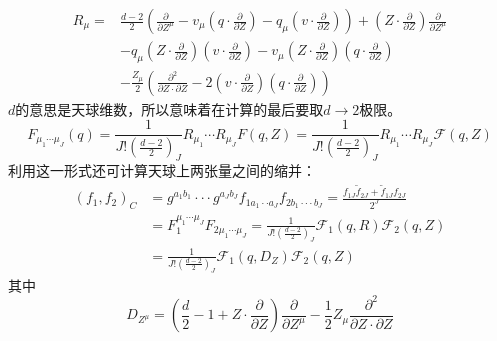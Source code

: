 \begin{equation}
	\begin{aligned}
		R_{\mu}=& \frac{d-2}{2}\left(\frac{\partial}{\partial Z^{\mu}}-v_{\mu}\left(q\cdot\frac{\partial}{\partial Z}\right)-q_{\mu}\left(v\cdot\frac{\partial}{\partial Z}\right)\right)+\left(Z\cdot\frac{\partial}{\partial Z}\right)\frac{\partial}{\partial Z^{\mu}}  \\
		&-q_{\mu}\left(Z\cdot\frac\partial{\partial Z}\right)\left(v\cdot\frac\partial{\partial Z}\right)-v_{\mu}\left(Z\cdot\frac\partial{\partial Z}\right)\left(q\cdot\frac\partial{\partial Z}\right) \\
		&-\frac{Z_{\mu}}{2}\left(\frac{\partial^{2}}{\partial Z\cdot\partial Z}-2\left(v\cdot\frac{\partial}{\partial Z}\right)\left(q\cdot\frac{\partial}{\partial Z}\right)\right)
	\end{aligned}
\end{equation}
$d$的意思是天球维数，所以意味着在计算的最后要取$d\to 2$极限。
\begin{equation}
	F_{\mu_{1}\cdots\mu_{J}}(q)=\frac{1}{J!\left(\frac{d-2}{2}\right)_{J}}R_{\mu_{1}}\cdots R_{\mu_{J}}F(q,Z)=\frac{1}{J!\left(\frac{d-2}{2}\right)_{J}}R_{\mu_{1}}\cdots R_{\mu_{J}}\mathcal{F}(q,Z)
\end{equation}
利用这一形式还可计算天球上两张量之间的缩并：
\begin{equation}
	\begin{aligned}
		(f_1,f_2)_C&=g^{a_1b_1}\cdotp\cdotp\cdotp g^{a_Jb_J}f_{1a_1\cdotp\cdotp a_J}f_{2b_1\cdotp\cdotp\cdotp b_J}=\frac{f_{1J}\tilde{f}_{2J}+\tilde{f}_{1J}f_{2J}}{2^J}\\
		&=F_{1}^{\mu_{1}\cdots\mu_{J}}F_{2\mu_{1}\cdots\mu_{J}}=\frac{1}{J!\left(\frac{d-2}{2}\right)_{J}}\mathcal{F}_{1}(q,R)\mathcal{F}_{2}(q,Z)\\
		&=\frac{1}{J!\left(\frac{d-2}{2}\right)_{J}}\mathcal{F}_{1}(q,D_Z)\mathcal{F}_{2}(q,Z)
	\end{aligned}
\end{equation}
其中
\[D_{Z^{\mu}}=\left(\frac{d}{2}-1+Z\cdot\frac{\partial}{\partial Z}\right)\frac{\partial}{\partial Z^{\mu}}-\frac{1}{2}Z_{\mu}\frac{\partial^{2}}{\partial Z\cdot\partial Z}\]
